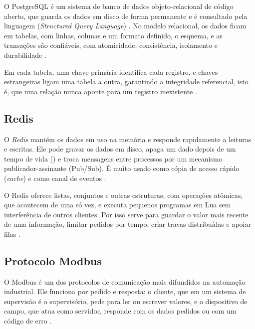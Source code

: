 \par O PostgreSQL é um sistema de banco de dados objeto-relacional de código aberto, que guarda os dados em disco de forma permanente e é consultado pela linguagem  (\emph{Structured Query Language}) \cite{POSTGRESQL_DOCS}. No modelo relacional, os dados ficam em tabelas, com linhas, colunas e um formato definido, o esquema, e as transações são confiáveis, com atomicidade, consistência, isolamento e durabilidade \cite{MOHAMED2014_RELATIONAL_VS_NOSQL}.

\par Em cada tabela, uma chave primária identifica cada registro, e chaves estrangeiras ligam uma tabela a outra, garantindo a integridade referencial, isto é, que uma relação nunca aponte para um registro inexistente \cite{POSTGRESQL_DOCS}.

\subsection{Redis}

\par O \emph{Redis} mantém os dados em uso na memória  e responde rapidamente a leituras e escritas. Ele pode gravar os dados em disco, apaga um dado depois de um tempo de vida () e troca mensagens entre processos por um mecanismo publicador-assinante (Pub/Sub). É muito usado como cópia de acesso rápido (\emph{cache}) e como canal de eventos \cite{REDIS_DOCS}.

\par O Redis oferece listas, conjuntos e outras estruturas, com operações atômicas, que acontecem de uma só vez, e executa pequenos programas em Lua sem interferência de outros clientes. Por isso serve para guardar o valor mais recente de uma informação, limitar pedidos por tempo, criar travas distribuídas e apoiar filas \cite{REDIS_DOCS}.

\subsection{Protocolo Modbus}

\par O Modbus é um dos protocolos de comunicação mais difundidos na automação industrial. Ele funciona por pedido e resposta: o cliente, que em um sistema de supervisão é o supervisório, pede para ler ou escrever valores, e o dispositivo de campo, que atua como servidor, responde com os dados pedidos ou com um código de erro \cite{MODBUS_TCP_IMPLEMENTATION_GUIDE}.

